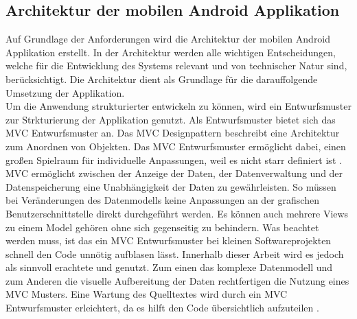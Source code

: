 \subsection{Architektur der mobilen Android Applikation}
Auf Grundlage der Anforderungen wird die Architektur der mobilen Android Applikation erstellt.
In der Architektur werden alle wichtigen Entscheidungen, welche für die Entwicklung des Systems relevant und von technischer Natur sind, berücksichtigt. Die Architektur dient als Grundlage für die darauffolgende Umsetzung der Applikation.\\
Um die Anwendung strukturierter entwickeln zu können, wird ein Entwurfsmuster zur Strkturierung der Applikation genutzt. Als Entwurfsmuster bietet sich das \ac{MVC} Entwurfsmuster an. Das \ac{MVC} Designpattern beschreibt eine Architektur zum Anordnen von Objekten. Das \ac{MVC} Entwurfsmuster ermöglicht dabei, einen großen Spielraum für individuelle Anpassungen, weil es nicht starr definiert ist \cite{bucanek:modelviewcontroller}.\\
MVC ermöglicht zwischen der Anzeige der Daten, der Datenverwaltung und der Datenspeicherung eine Unabhängigkeit der Daten zu gewährleisten. So müssen bei Veränderungen des Datenmodells keine Anpassungen an der grafischen Benutzerschnittstelle direkt durchgeführt werden. Es können auch mehrere Views zu einem Model gehören ohne sich gegenseitig zu behindern. Was beachtet werden muss, ist das ein \ac{MVC} Entwurfsmuster bei kleinen Softwareprojekten schnell den Code unnötig aufblasen lässt. Innerhalb dieser Arbeit wird es jedoch als sinnvoll erachtete und genutzt. Zum einen das komplexe Datenmodell und zum Anderen die visuelle Aufbereitung der Daten rechtfertigen die Nutzung eines MVC Musters. Eine Wartung des Quelltextes wird durch ein \ac{MVC} Entwurfsmuster erleichtert, da es hilft den Code übersichtlich aufzuteilen \cite{bucanek:modelviewcontroller}.

